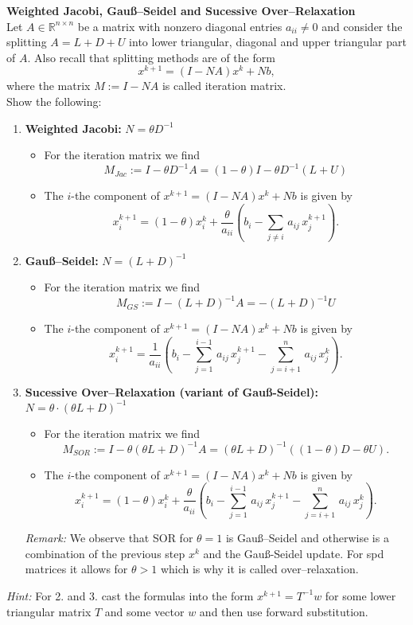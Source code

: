 \textbf{Weighted Jacobi, Gauß--Seidel and Sucessive Over--Relaxation}\\
Let $A\in \mathbb{R}^{n \times n}$ be a matrix with nonzero diagonal entries $a_{ii}\neq 0$ and consider the splitting $A=L+D+U$ into lower triangular, diagonal and upper triangular part of $A$. Also recall that splitting methods are of the form
$$x^{k+1} = (I-NA)x^k + Nb, $$
where the matrix $M:=I-NA$ is called iteration matrix.\\

Show the following:
\begin{enumerate}
	\item \textbf{Weighted Jacobi:} $N=\theta D^{-1}$
	\begin{itemize}
		\item For the iteration matrix we find
		$$M_{Jac} := I-\theta D^{-1}A = (1-\theta)I - \theta D^{-1}(L+U) $$
		\item The $i$-the component of $x^{k+1}=(I-NA)x^k + Nb$ is given by
		$$x^{k+1}_i = (1-\theta)x_i^k +  \frac{\theta}{a_{ii}}\left( b_i - \sum_{j\neq i} \,a_{ij} \, x_j^{k+1}\right).$$
	\end{itemize} 
	\item \textbf{Gauß--Seidel:} $N=(L+D)^{-1}$
		\begin{itemize}
		\item For the iteration matrix we find
		$$M_{GS} := I- (L+D)^{-1}A =-(L+D)^{-1}U$$
		\item The $i$-the component of $x^{k+1}=(I-NA)x^k + Nb$ is given by
		$$x^{k+1}_i =  \frac{1}{a_{ii}}\left( b_i - \sum\limits^{i-1}_{j=1} \,a_{ij} \, x_j^{k+1} -  \sum\limits^n_{j = i+1} \, a_{ij} \, x^k_j  \right).$$
	\end{itemize} 
	\item \textbf{Sucessive Over--Relaxation (variant of Gauß-Seidel):}  $N=\theta\cdot(\theta L+D)^{-1}$
		\begin{itemize}
	\item For the iteration matrix we find
	$$M_{SOR} :=I-\theta( \theta L+D )^{-1}A=(\theta L +D)^{-1} ((1-\theta)D-\theta U).$$
		\item  The $i$-the component of $x^{k+1}=(I-NA)x^k + Nb$ is given by
	$$ x^{k+1}_i = (1-\theta)x_i^k+   \frac{\theta}{a_{ii}}\left( b_i - \sum\limits^{i-1}_{j=1} \,a_{ij} \, x_j^{k+1} -  \sum\limits^n_{j = i+1} \, a_{ij} \, x^k_j  \right).$$
	\end{itemize}
{\color{navy}\textit{Remark:} We observe that SOR for $\theta = 1$ is Gauß--Seidel and otherwise is a combination of the previous step $x^k$ and the Gauß-Seidel update. For spd matrices it allows for $\theta > 1$ which is why it is called over--relaxation.}
\end{enumerate}
\textit{Hint:} For 2. and 3. cast the formulas into the form $x^{k+1}=T^{-1}w$ for some lower triangular matrix $T$ and some vector $w$ and then use forward substitution.\\~\\
